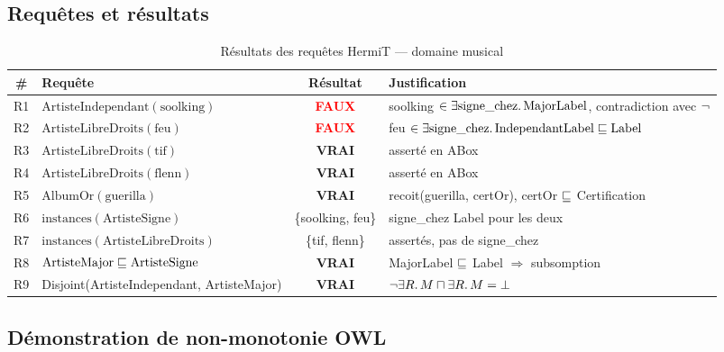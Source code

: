 \subsection{Requêtes et résultats}

\begin{table}[H]
\centering
\caption{Résultats des requêtes HermiT — domaine musical}
\begin{tabularx}{\linewidth}{clcX}
\toprule
\textbf{\#} & \textbf{Requête} & \textbf{Résultat} & \textbf{Justification} \\
\midrule
R1 & $\text{ArtisteIndependant}(\text{soolking})$
   & \textcolor{red}{\textbf{FAUX}}
   & soolking $\in \exists \text{signe\_chez}.\,\text{MajorLabel}$,
     contradiction avec $\lnot$ \\
R2 & $\text{ArtisteLibreDroits}(\text{feu})$
   & \textcolor{red}{\textbf{FAUX}}
   & feu $\in \exists \text{signe\_chez}.\,\text{IndependantLabel} \sqsubseteq \text{Label}$ \\
R3 & $\text{ArtisteLibreDroits}(\text{tif})$
   & \textcolor{codegreen}{\textbf{VRAI}}
   & asserté en ABox \\
R4 & $\text{ArtisteLibreDroits}(\text{flenn})$
   & \textcolor{codegreen}{\textbf{VRAI}}
   & asserté en ABox \\
R5 & $\text{AlbumOr}(\text{guerilla})$
   & \textcolor{codegreen}{\textbf{VRAI}}
   & recoit(guerilla, certOr), certOr $\sqsubseteq$ Certification \\
R6 & $\text{instances}(\text{ArtisteSigne})$
   & \{soolking, feu\}
   & signe\_chez Label pour les deux \\
R7 & $\text{instances}(\text{ArtisteLibreDroits})$
   & \{tif, flenn\}
   & assertés, pas de signe\_chez \\
R8 & $\text{ArtisteMajor} \sqsubseteq \text{ArtisteSigne}$
   & \textcolor{codegreen}{\textbf{VRAI}}
   & MajorLabel $\sqsubseteq$ Label $\Rightarrow$ subsomption \\
R9 & Disjoint(ArtisteIndependant, ArtisteMajor)
   & \textcolor{codegreen}{\textbf{VRAI}}
   & $\lnot \exists R.\,M \sqcap \exists R.\,M = \bot$ \\
\bottomrule
\end{tabularx}
\end{table}

\subsection{Démonstration de non-monotonie OWL}


